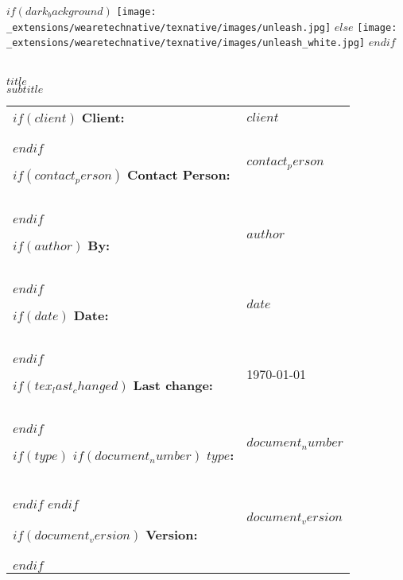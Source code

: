 \begin{titlepage}

\vspace*{-3cm}

\begin{center}
  $if(dark_background)$
    \texttt{[image: \_extensions/wearetechnative/texnative/images/unleash.jpg]}
  $else$
    \texttt{[image: \_extensions/wearetechnative/texnative/images/unleash\_white.jpg]}
  $endif$
\end{center}

\begin{spacing}{2.0}

\noindent
\\
{\huge {\MakeUppercase{$title$}}}\\
{\Large {$subtitle$}}\\
\end{spacing}


\setlength\extrarowheight{3pt}
\begin{flushleft}
\noindent\begin{tabular}{@{}l l }

$if(client)$
{\bf Client:} & $client$ \\
$endif$

$if(contact_person)$
  {\bf Contact Person:} & $contact_person$ \\
$endif$

$if(author)$
{\bf By: } & $author$ \\
$endif$

$if(date)$
{\bf Date: } & $date$ \\
$endif$

$if(tex_last_changed)$
{\bf Last change:} & \today \\
$endif$

$if(type)$
  $if(document_number)$
  {\bf $type$:} & $document_number$ \\
  $endif$
$endif$

$if(document_version)$
{\bf Version:} & $document_version$ \\
$endif$

\end{tabular}
\end{flushleft}

\end{titlepage}


